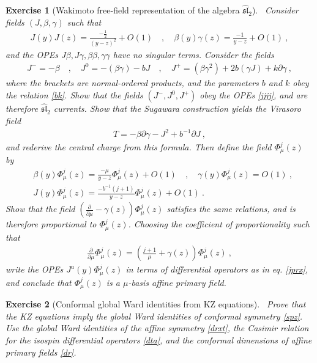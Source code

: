 \documentclass[12pt, a4paper, notitlepage, twoside]{report}
\numberwithin{equation}{section}
\theoremstyle{break}
\newtheorem{exo}{Exercise}[chapter]
\begin{document}
\begin{exo}[Wakimoto free-field representation of the algebra $\widehat{\mathfrak{sl}}_2$]
 ~\label{exowaki}
Consider fields $(J,\beta,\gamma)$ such that 
\begin{align}
 J(y)J(z) = \frac{-\frac12}{(y-z)^2} + O(1) \quad , \quad \beta(y)\gamma(z) = \frac{-1}{y-z} + O(1)\ ,
\end{align}
and the OPEs $J\beta,J\gamma,\beta\beta,\gamma\gamma$ have no singular terms.
Consider the fields 
\begin{align}
 J^- = -\beta \quad , \quad J^0 = -(\beta\gamma) - bJ \quad , \quad J^+ = (\beta\gamma^2)+2b(\gamma J)+k\partial\gamma\ ,
\end{align}
where the brackets are normal-ordered products, and the parameters $b$ and $k$ obey the relation \eqref{bk}.
Show that the fields $(J^-,J^0,J^+)$ obey the OPEs \eqref{jjjj}, and are therefore $\widehat{\mathfrak{sl}}_2$ currents. 
Show that the Sugawara construction yields the Virasoro field
\begin{align}
 T = -\beta \partial\gamma - J^2 +b^{-1}\partial J\ ,
\end{align}
and rederive the central charge from this formula.
Then define the field $\Phi^j_\mu(z)$ by 
\begin{align}
 & \beta(y)\Phi^j_\mu(z) = \frac{-\mu}{y-z}\Phi^j_\mu(z)+ O(1) \quad , \quad \gamma(y)\Phi^j_\mu(z)=O(1)\ , 
\\
 & J(y)\Phi^j_\mu(z) = \frac{-b^{-1}(j+1)}{y-z}\Phi^j_\mu(z)+ O(1)\ .
\end{align}
Show that the field $\left({\frac{\partial}{\partial \mu}}-\gamma(z)\right)\Phi^j_\mu(z)$ satisfies the same relations, and is therefore proportional to $\Phi^j_\mu(z)$.
Choosing the coefficient of proportionality such that
\begin{align}
 {\frac{\partial}{\partial \mu}}\Phi^j_\mu(z) =\left(\frac{j+1}{\mu}+\gamma(z)\right)\Phi^j_\mu(z)\ ,
\end{align}
write the OPEs $J^a(y)\Phi^j_\mu(z)$ in terms of differential operators as in eq. \eqref{jprx}, and conclude that $\Phi^j_\mu(z)$ is a $\mu$-basis affine primary field.
\end{exo}

\begin{exo}[Conformal global Ward identities from KZ equations]
 ~\label{exokz}
 Prove that the KZ equations imply the global Ward identities of conformal symmetry \eqref{spz}.
 Use the global Ward identities of the affine symmetry \eqref{drxt}, the Casimir relation for the isospin differential operators \eqref{dta}, and the conformal dimensions of affine primary fields \eqref{dr}. 
\end{exo}
\end{document}
